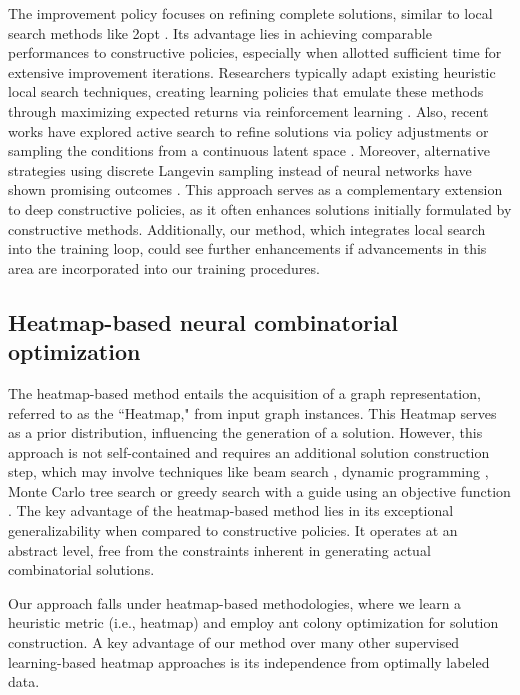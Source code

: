 \documentclass[twoside]{article}
\theoremstyle{plain}
\theoremstyle{definition}
\theoremstyle{remark}
\begin{document}
The improvement policy focuses on refining complete solutions, similar to local search methods like 2opt \citep{Croes58}. Its advantage lies in achieving comparable performances to constructive policies, especially when allotted sufficient time for extensive improvement iterations. Researchers typically adapt existing heuristic local search techniques, creating learning policies that emulate these methods through maximizing expected returns via reinforcement learning \citep{d2020learning,NLNS,ma2021learning,ma2022efficient,ma2023learning,kim2022neuro}. Also, recent works have explored active search to refine solutions via policy adjustments \citep{hottung2021efficient, son2023meta} or sampling the conditions from a continuous latent space \citep{chalumeau2023combinatorial}. Moreover, alternative strategies using discrete Langevin sampling instead of neural networks have shown promising outcomes \citep{pmlr-v202-sun23c}. This approach serves as a complementary extension to deep constructive policies, as it often enhances solutions initially formulated by constructive methods. Additionally, our method, which integrates local search into the training loop, could see further enhancements if advancements in this area are incorporated into our training procedures.

\subsection{Heatmap-based neural combinatorial optimization}\label{app:heatmap}


The heatmap-based method \citep{joshi2021learning} entails the acquisition of a graph representation, referred to as the ``Heatmap," from input graph instances. This Heatmap serves as a prior distribution, influencing the generation of a solution. However, this approach is not self-contained and requires an additional solution construction step, which may involve techniques like beam search \citep{joshi2021learning}, dynamic programming \citep{kool2022deep}, Monte Carlo tree search \citep{fu2021generalize, qiu2022dimes, sun2023difusco, xia2024position} or greedy search with a guide using an objective function \citep{li2023from}. The key advantage of the heatmap-based method lies in its exceptional generalizability when compared to constructive policies. It operates at an abstract level, free from the constraints inherent in generating actual combinatorial solutions.

Our approach falls under heatmap-based methodologies, where we learn a heuristic metric (i.e., heatmap) and employ ant colony optimization for solution construction. A key advantage of our method over many other supervised learning-based heatmap approaches is its independence from optimally labeled data. 
\end{document}

